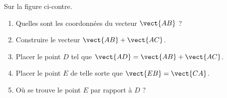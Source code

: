 
\begin{exercice}[\ldots/5]\label{exosmath-0697}

\begin{wrapfigure}{r}{6.0cm}
   \vspace{-0.5cm}        %
   \centering
   
\end{wrapfigure}

    Sur la figure ci-contre.

    \begin{enumerate}
        \item
            Quelles sont les coordonnées du vecteur \( \vect{ AB }\) ?
        \item
            Construire le vecteur \( \vect{ AB }+\vect{ AC }\).
        \item
            Placer le point \( D\) tel que \( \vect{ AD }=\vect{ AB }+\vect{ AC }\).
        \item
            Placer le point \( E\) de telle sorte que \( \vect{ EB }=\vect{ CA }\).
        \item
            Où se trouve le point \( E\) par rapport à \( D\) ?
    \end{enumerate}

\end{exercice}
